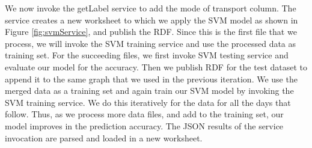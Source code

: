 We now invoke the getLabel service to add the mode of transport column. The service creates a new worksheet to which we apply the SVM model as shown in Figure \ref{fig:svmService}, and publish the RDF. Since this is the first file that we process, we will invoke the SVM training service and use the processed data as training set. For the succeeding files, we first invoke SVM testing service and evaluate our model for the accuracy. Then we publish RDF for the test dataset to append it to the same graph that we used in the previous iteration. We use the merged data as a training set and again train our SVM model by invoking the SVM training service. We do this iteratively for the data for all the days that follow. Thus, as we process more data files, and add to the training set, our model improves in the prediction accuracy. The JSON results of the service invocation are parsed and loaded in a new worksheet. 